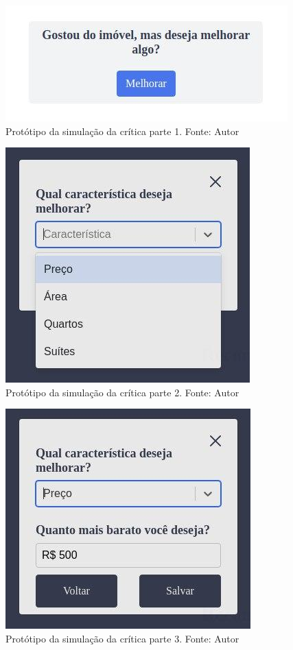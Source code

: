 \begin{figure}[H]
    \centering
    \includegraphics[scale=0.9]{figuras/consideracoes_finais/prototipo_simulacao_critica1.jpg}
    \caption[Protótipo da simulação da crítica parte 1]{Protótipo da simulação da crítica parte 1. Fonte: Autor}
    \label{fig:prototipo_simulacao_critica1}
\end{figure}

\begin{figure}[H]
    \centering
    \includegraphics[scale=0.7]{figuras/consideracoes_finais/prototipo_simulacao_critica2.jpg}
    \caption[Protótipo da simulação da crítica parte 2]{Protótipo da simulação da crítica parte 2. Fonte: Autor}
    \label{fig:prototipo_simulacao_critica2}
\end{figure}

\begin{figure}[H]
    \centering
    \includegraphics[scale=0.7]{figuras/consideracoes_finais/prototipo_simulacao_critica3.jpg}
    \caption[Protótipo da simulação da crítica parte 3]{Protótipo da simulação da crítica parte 3. Fonte: Autor}
    \label{fig:prototipo_simulacao_critica3}
\end{figure}

